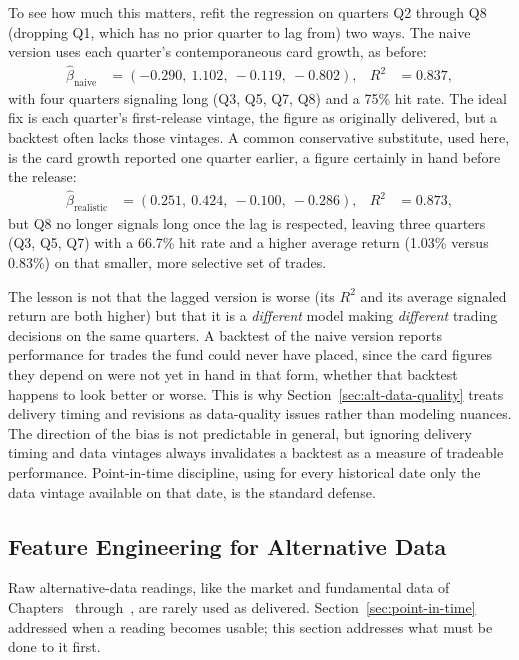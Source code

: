 \documentclass[../ai_in_finance]{subfiles}
\begin{document}
To see how much this matters, refit the regression on quarters Q2 through Q8 (dropping Q1, which has no prior quarter to lag from) two ways. The naive version uses each quarter's contemporaneous card growth, as before:
\begin{align*}
\hat\beta_{\text{naive}} &= (-0.290,\ 1.102,\ -0.119,\ -0.802), & R^2 &= 0.837,
\end{align*}
with four quarters signaling long (Q3, Q5, Q7, Q8) and a 75\% hit rate. The ideal fix is each quarter's first-release vintage, the figure as originally delivered, but a backtest often lacks those vintages. A common conservative substitute, used here, is the card growth reported one quarter earlier, a figure certainly in hand before the release:
\begin{align*}
\hat\beta_{\text{realistic}} &= (0.251,\ 0.424,\ -0.100,\ -0.286), & R^2 &= 0.873,
\end{align*}
but Q8 no longer signals long once the lag is respected, leaving three quarters (Q3, Q5, Q7) with a 66.7\% hit rate and a higher average return (1.03\% versus 0.83\%) on that smaller, more selective set of trades.

The lesson is not that the lagged version is worse (its $R^2$ and its average signaled return are both higher) but that it is a \emph{different} model making \emph{different} trading decisions on the same quarters. A backtest of the naive version reports performance for trades the fund could never have placed, since the card figures they depend on were not yet in hand in that form, whether that backtest happens to look better or worse. This is why Section~\ref{sec:alt-data-quality} treats delivery timing and revisions as data-quality issues rather than modeling nuances. The direction of the bias is not predictable in general, but ignoring delivery timing and data vintages always invalidates a backtest as a measure of tradeable performance. Point-in-time discipline, using for every historical date only the data vintage available on that date, is the standard defense.

\subsection{Feature Engineering for Alternative Data}
\label{sec:altdata-feature-engineering}

Raw alternative-data readings, like the market and fundamental data of Chapters~ through~, are rarely used as delivered. Section~\ref{sec:point-in-time} addressed when a reading becomes usable; this section addresses what must be done to it first.
\end{document}
